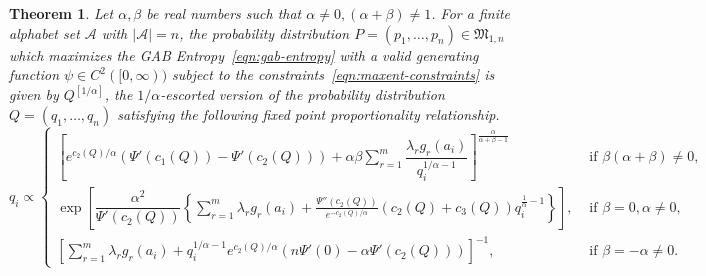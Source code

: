 \documentclass[11pt]{article}
\theoremstyle{plain}
\newtheorem{theorem}{Theorem}[section]
\theoremstyle{remark}
\newcommand{\Acal}{\mathcal{A}}
\newcommand{\Mfrak}{\mathfrak{M}}
\begin{document}
\begin{theorem}\label{thm:maxent-dist}
    Let $\alpha, \beta$ be real numbers such that $\alpha \neq 0, (\alpha+\beta) \neq 1$. For a finite alphabet set $\Acal$ with $\vert \Acal\vert = n$, the probability distribution $P = (p_1, \dots, p_n) \in \Mfrak_{1, n}$ which maximizes the GAB Entropy~\eqref{eqn:gab-entropy} with a valid generating function $\psi \in C^2([0,\infty))$ subject to the constraints~\eqref{eqn:maxent-constraints} is given by $Q^{[1/\alpha]}$, the $1/\alpha$-escorted version of the probability distribution $Q = (q_1, \dots, q_n)$ satisfying the following fixed point proportionality relationship.
    \begin{equation}
        q_i \propto \begin{cases}
            \left[  e^{c_2(Q)/\alpha} (\Psi'(c_1(Q)) - \Psi'(c_2(Q))) + \alpha\beta \sum_{r=1}^m \dfrac{\lambda_r g_r(a_i)}{q_i^{1/\alpha-1}} \right]^{\frac{\alpha}{\alpha+\beta-1}}
                                                                                                                                                                                                                     & \text{ if } \beta(\alpha+\beta) \neq 0, \\
            \exp\left[ \dfrac{\alpha^2}{\Psi'(c_2(Q))} \left\{ \sum_{r=1}^m \lambda_r g_r(a_i) + \frac{\Psi''(c_2(Q))}{e^{-c_2(Q)/\alpha}} \left( c_2(Q) + c_3(Q) \right) q_i^{\frac{1}{\alpha}-1} \right\} \right], & \text{ if } \beta = 0, \alpha \neq 0,   \\
            \left[ \sum_{r=1}^m \lambda_r g_r(a_i) + q_i^{1/\alpha-1} e^{c_2(Q)/\alpha} (n\Psi'(0) - \alpha\Psi'(c_2(Q)))  \right]^{-1},
                                                                                                                                                                                                                     & \text{ if } \beta = -\alpha \neq 0.
        \end{cases}
        \label{eqn:maxent-dist-type}
    \end{equation}


\end{theorem}
\end{document}

